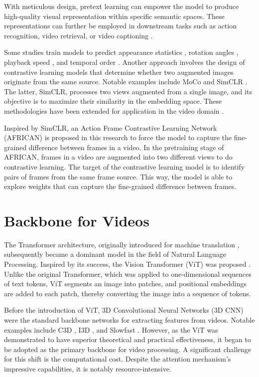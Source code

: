 With meticulous design, pretext learning can empower the model to produce high-quality visual representation within specific semantic spaces. These representations can further be employed in downstream tasks such as action recognition, video retrieval, or video captioning \parencite{10.1145/3577925}.

Some studies train models to predict appearance statistics \parencite{Wang_2019_CVPR}, rotation angles \parencite{DBLP:journals/corr/abs-1811-11387}, playback speed \parencite{Yao_2020_CVPR, 10.1007/978-3-030-58520-4_30}, and temporal order \parencite{10.1007/978-3-030-58604-1_26}. Another approach involves the design of contrastive learning models that determine whether two augmented images originate from the same source. Notable examples include MoCo \parencite{finn2017model} and SimCLR \parencite{pmlr-v119-chen20j}. The latter, SimCLR, processes two views augmented from a single image, and its objective is to maximize their similarity in the embedding space. These methodologies have been extended for application in the video domain \parencite{Feichtenhofer_2021_CVPR}.

Inspired by SimCLR, an Action Frame Contrastive Learning Network (AFRICAN) is proposed in this research to force the model to capture the fine-grained difference between frames in a video. In the pretraining stage of AFRICAN, frames in a video are augmented into two different views to do contrastive learning. The target of the contrastive learning model is to identify pairs of frames from the same frame source. This way, the model is able to explore weights that can capture the fine-grained difference between frames. 

\section{Backbone for Videos}
The Transformer architecture, originally introduced for machine translation \parencite{vaswani2017attention}, subsequently became a dominant model in the field of Natural Language Processing. Inspired by its success, the Vision Transformer (ViT) was proposed \parencite{dosovitskiy2020image}. Unlike the original Transformer, which was applied to one-dimensional sequences of text tokens, ViT segments an image into patches, and positional embeddings are added to each patch, thereby converting the image into a sequence of tokens.

Before the introduction of ViT, 3D Convolutional Neural Networks (3D CNN) were the standard backbone networks for extracting features from videos. Notable examples include C3D \parencite{tran2015learning}, I3D \parencite{carreira2017quo}, and Slowfast \parencite{feichtenhofer2019slowfast}. However, as the ViT was demonstrated to have superior theoretical and practical effectiveness, it began to be adopted as the primary backbone for video processing. A significant challenge for this shift is the computational cost. Despite the attention mechanism's impressive capabilities, it is notably resource-intensive.

